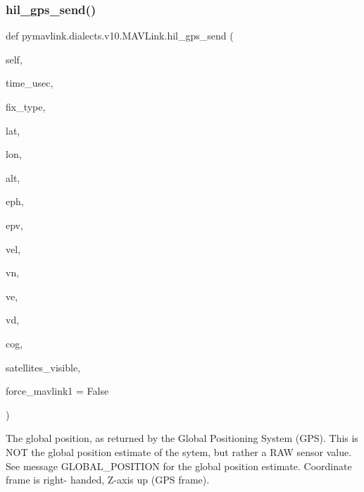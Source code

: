\begin{DoxyVerb}
\begin{DoxyVerb}
\subsubsection{\texorpdfstring{hil\+\_\+gps\+\_\+send()}{hil\_gps\_send()}}
{\footnotesize\ttfamily def pymavlink.\+dialects.\+v10.\+M\+A\+V\+Link.\+hil\+\_\+gps\+\_\+send (\begin{DoxyParamCaption}\item[{}]{self,  }\item[{}]{time\+\_\+usec,  }\item[{}]{fix\+\_\+type,  }\item[{}]{lat,  }\item[{}]{lon,  }\item[{}]{alt,  }\item[{}]{eph,  }\item[{}]{epv,  }\item[{}]{vel,  }\item[{}]{vn,  }\item[{}]{ve,  }\item[{}]{vd,  }\item[{}]{cog,  }\item[{}]{satellites\+\_\+visible,  }\item[{}]{force\+\_\+mavlink1 = {\ttfamily False} }\end{DoxyParamCaption})}

\begin{DoxyVerb}The global position, as returned by the Global Positioning System
(GPS). This is                  NOT the global
position estimate of the sytem, but rather a RAW
sensor value. See message GLOBAL_POSITION for the
global position estimate. Coordinate frame is right-
handed, Z-axis up (GPS frame).


\end{DoxyVerb}
\end{DoxyVerb}
\end{DoxyVerb}
